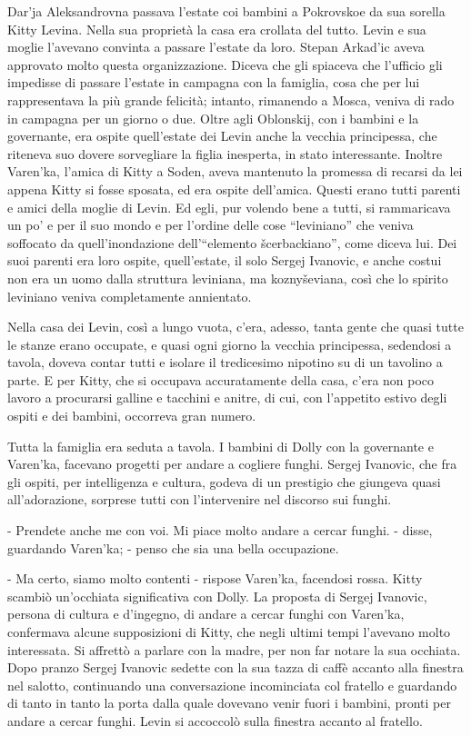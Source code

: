 \label{parte-sesta} 
\pagestyle{pagina}

\label{i-5} 

Dar'ja Aleksandrovna passava l'estate coi bambini a Pokrovskoe da sua sorella Kitty Levina. Nella sua proprietà la casa era crollata del tutto. Levin e sua moglie l'avevano convinta a passare l'estate da loro. Stepan Arkad'ic aveva approvato molto questa organizzazione. Diceva che gli spiaceva che l'ufficio gli impedisse di passare l'estate in campagna con la famiglia, cosa che per lui rappresentava la più grande felicità; intanto, rimanendo a Mosca, veniva di rado in campagna per un giorno o due. Oltre agli Oblonskij, con i bambini e la governante, era ospite quell'estate dei Levin anche la vecchia principessa, che riteneva suo dovere sorvegliare la figlia inesperta, in stato interessante. Inoltre Varen'ka, l'amica di Kitty a Soden, aveva mantenuto la promessa di recarsi da lei appena Kitty si fosse sposata, ed era ospite dell'amica. Questi erano tutti parenti e amici della moglie di Levin. Ed egli, pur volendo bene a tutti, si rammaricava un po' e per il suo mondo e per l'ordine delle cose ``leviniano'' che veniva soffocato da quell'inondazione dell'``elemento šcerbackiano'', come diceva lui. Dei suoi parenti era loro ospite, quell'estate, il solo Sergej Ivanovic, e anche costui non era un uomo dalla struttura leviniana, ma koznyševiana, così che lo spirito leviniano veniva completamente annientato. 

Nella casa dei Levin, così a lungo vuota, c'era, adesso, tanta gente che quasi tutte le stanze erano occupate, e quasi ogni giorno la vecchia principessa, sedendosi a tavola, doveva contar tutti e isolare il tredicesimo nipotino su di un tavolino a parte. E per Kitty, che si occupava accuratamente della casa, c'era non poco lavoro a procurarsi galline e tacchini e anitre, di cui, con l'appetito estivo degli ospiti e dei bambini, occorreva gran numero. 

Tutta la famiglia era seduta a tavola. I bambini di Dolly con la governante e Varen'ka, facevano progetti per andare a cogliere funghi. Sergej Ivanovic, che fra gli ospiti, per intelligenza e cultura, godeva di un prestigio che giungeva quasi all'adorazione, sorprese tutti con l'intervenire nel discorso sui funghi. 

- Prendete anche me con voi. Mi piace molto andare a cercar funghi. - disse, guardando Varen'ka; - penso che sia una bella occupazione. 

- Ma certo, siamo molto contenti - rispose Varen'ka, facendosi rossa. Kitty scambiò un'occhiata significativa con Dolly. La proposta di Sergej Ivanovic, persona di cultura e d'ingegno, di andare a cercar funghi con Varen'ka, confermava alcune supposizioni di Kitty, che negli ultimi tempi l'avevano molto interessata. Si affrettò a parlare con la madre, per non far notare la sua occhiata. Dopo pranzo Sergej Ivanovic sedette con la sua tazza di caffè accanto alla finestra nel salotto, continuando una conversazione incominciata col fratello e guardando di tanto in tanto la porta dalla quale dovevano venir fuori i bambini, pronti per andare a cercar funghi. Levin si accoccolò sulla finestra accanto al fratello. 

